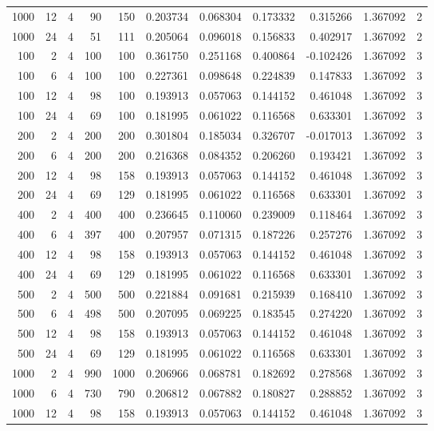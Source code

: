 \begin{table}
\begin{tabular}{rrrrrrrrrrr}
1000 & 12 & 4 & 90 & 150 & 0.203734 & 0.068304 & 0.173332 & 0.315266 & 1.367092 & 2 \\
1000 & 24 & 4 & 51 & 111 & 0.205064 & 0.096018 & 0.156833 & 0.402917 & 1.367092 & 2 \\
100 & 2 & 4 & 100 & 100 & 0.361750 & 0.251168 & 0.400864 & -0.102426 & 1.367092 & 3 \\
100 & 6 & 4 & 100 & 100 & 0.227361 & 0.098648 & 0.224839 & 0.147833 & 1.367092 & 3 \\
100 & 12 & 4 & 98 & 100 & 0.193913 & 0.057063 & 0.144152 & 0.461048 & 1.367092 & 3 \\
100 & 24 & 4 & 69 & 100 & 0.181995 & 0.061022 & 0.116568 & 0.633301 & 1.367092 & 3 \\
200 & 2 & 4 & 200 & 200 & 0.301804 & 0.185034 & 0.326707 & -0.017013 & 1.367092 & 3 \\
200 & 6 & 4 & 200 & 200 & 0.216368 & 0.084352 & 0.206260 & 0.193421 & 1.367092 & 3 \\
200 & 12 & 4 & 98 & 158 & 0.193913 & 0.057063 & 0.144152 & 0.461048 & 1.367092 & 3 \\
200 & 24 & 4 & 69 & 129 & 0.181995 & 0.061022 & 0.116568 & 0.633301 & 1.367092 & 3 \\
400 & 2 & 4 & 400 & 400 & 0.236645 & 0.110060 & 0.239009 & 0.118464 & 1.367092 & 3 \\
400 & 6 & 4 & 397 & 400 & 0.207957 & 0.071315 & 0.187226 & 0.257276 & 1.367092 & 3 \\
400 & 12 & 4 & 98 & 158 & 0.193913 & 0.057063 & 0.144152 & 0.461048 & 1.367092 & 3 \\
400 & 24 & 4 & 69 & 129 & 0.181995 & 0.061022 & 0.116568 & 0.633301 & 1.367092 & 3 \\
500 & 2 & 4 & 500 & 500 & 0.221884 & 0.091681 & 0.215939 & 0.168410 & 1.367092 & 3 \\
500 & 6 & 4 & 498 & 500 & 0.207095 & 0.069225 & 0.183545 & 0.274220 & 1.367092 & 3 \\
500 & 12 & 4 & 98 & 158 & 0.193913 & 0.057063 & 0.144152 & 0.461048 & 1.367092 & 3 \\
500 & 24 & 4 & 69 & 129 & 0.181995 & 0.061022 & 0.116568 & 0.633301 & 1.367092 & 3 \\
1000 & 2 & 4 & 990 & 1000 & 0.206966 & 0.068781 & 0.182692 & 0.278568 & 1.367092 & 3 \\
1000 & 6 & 4 & 730 & 790 & 0.206812 & 0.067882 & 0.180827 & 0.288852 & 1.367092 & 3 \\
1000 & 12 & 4 & 98 & 158 & 0.193913 & 0.057063 & 0.144152 & 0.461048 & 1.367092 & 3 \\

\end{tabular}
\end{table}
